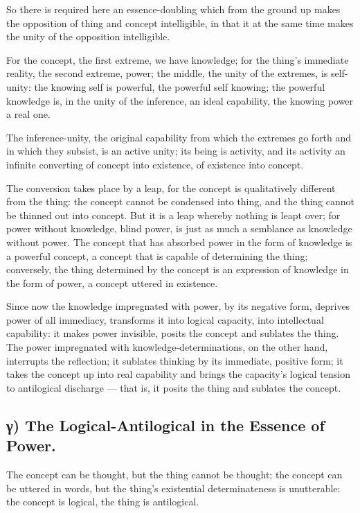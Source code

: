 \documentclass[12pt]{book}
\begin{document}
So there is required here an essence-doubling which from the ground
up makes the opposition of thing and concept intelligible, in that
it at the same time makes the unity of the opposition intelligible.

For the concept, the first extreme, we have knowledge; for the
thing's immediate reality, the second extreme, power; the middle,
the unity of the extremes, is self-unity: the knowing self is
powerful, the powerful self knowing; the powerful knowledge is, in
the unity of the inference, an ideal capability, the knowing power a
real one.

The inference-unity, the original capability from which the extremes
go forth and in which they subsist, is an active unity; its being is
activity, and its activity an infinite converting of concept into
existence, of existence into concept.

The conversion takes place by a leap, for the concept is
qualitatively different from the thing: the concept cannot be
condensed into thing, and the thing cannot be thinned out into
concept. But it is a leap whereby nothing is leapt over; for power
without knowledge, blind power, is just as much a semblance as
knowledge without power. The concept that has absorbed power in the
form of knowledge is a powerful concept, a concept that is capable
of determining the thing; conversely, the thing determined by the
concept is an expression of knowledge in the form of power, a
concept uttered in existence.

Since now the knowledge impregnated with power, by its negative
form, deprives power of all immediacy, transforms it into logical
capacity, into intellectual capability: it makes power invisible,
posits the concept and sublates the thing. The power impregnated
with knowledge-determinations, on the other hand, interrupts the
reflection; it sublates thinking by its immediate,
positive form; it takes the concept up into real capability and
brings the capacity's logical tension to antilogical discharge ---
that is, it posits the thing and sublates the concept.

\subsection*{γ) The Logical-Antilogical in the Essence of Power.}

The concept can be thought, but the thing cannot be thought; the
concept can be uttered in words, but the thing's existential
determinateness is unutterable: the concept is logical, the thing is
antilogical.
\end{document}
